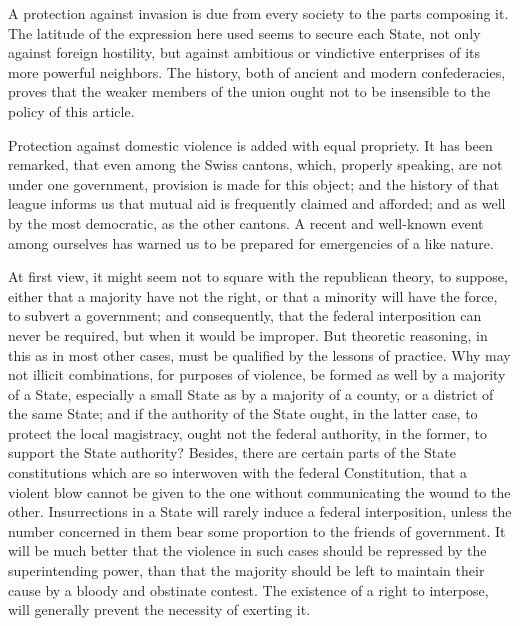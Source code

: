 A protection against invasion is due from every society to the parts composing it. 
The latitude of the expression here used seems to secure each State, not only against foreign hostility, but against ambitious or vindictive enterprises of its more powerful neighbors. 
The history, both of ancient and modern confederacies, proves that the weaker members of the union ought not to be insensible to the policy of this article.

Protection against domestic violence is added with equal propriety. 
It has been remarked, that even among the Swiss cantons, which, properly speaking, are not under one government, provision is made for this object; and the history of that league informs us that mutual aid is frequently claimed and afforded; and as well by the most democratic, as the other cantons. 
A recent and well-known event among ourselves has warned us to be prepared for emergencies of a like nature.

At first view, it might seem not to square with the republican theory, to suppose, either that a majority have not the right, or that a minority will have the force, to subvert a government; and consequently, that the federal interposition can never be required, but when it would be improper. 
But theoretic reasoning, in this as in most other cases, must be qualified by the lessons of practice. 
Why may not illicit combinations, for purposes of violence, be formed as well by a majority of a State, especially a small State as by a majority of a county, or a district of the same State; and if the authority of the State ought, in the latter case, to protect the local magistracy, ought not the federal authority, in the former, to support the State authority? 
Besides, there are certain parts of the State constitutions which are so interwoven with the federal Constitution, that a violent blow cannot be given to the one without communicating the wound to the other. 
Insurrections in a State will rarely induce a federal interposition, unless the number concerned in them bear some proportion to the friends of government. 
It will be much better that the violence in such cases should be repressed by the superintending power, than that the majority should be left to maintain their cause by a bloody and obstinate contest. 
The existence of a right to interpose, will generally prevent the necessity of exerting it.

